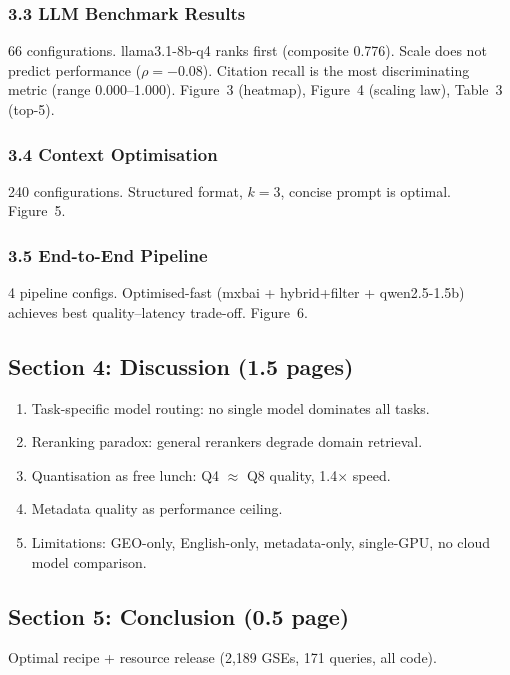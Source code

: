 \documentclass[11pt,a4paper]{article}
\begin{document}
\subsubsection{3.3 LLM Benchmark Results}
66 configurations. llama3.1-8b-q4 ranks first (composite 0.776). Scale
does not predict performance ($\rho=-0.08$). Citation recall is the most
discriminating metric (range 0.000--1.000). Figure~3 (heatmap), Figure~4
(scaling law), Table~3 (top-5).

\subsubsection{3.4 Context Optimisation}
240 configurations. Structured format, $k=3$, concise prompt is optimal.
Figure~5.

\subsubsection{3.5 End-to-End Pipeline}
4 pipeline configs. Optimised-fast (mxbai + hybrid+filter + qwen2.5-1.5b)
achieves best quality--latency trade-off. Figure~6.

\subsection{Section 4: Discussion (1.5 pages)}

\begin{enumerate}[leftmargin=2em]
  \item Task-specific model routing: no single model dominates all tasks.
  \item Reranking paradox: general rerankers degrade domain retrieval.
  \item Quantisation as free lunch: Q4 $\approx$ Q8 quality, 1.4$\times$ speed.
  \item Metadata quality as performance ceiling.
  \item Limitations: GEO-only, English-only, metadata-only, single-GPU,
        no cloud model comparison.
\end{enumerate}

\subsection{Section 5: Conclusion (0.5 page)}

Optimal recipe + resource release (2{,}189 GSEs, 171 queries, all code).
\end{document}
